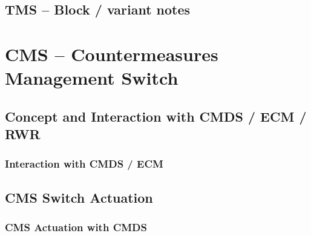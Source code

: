 \documentclass[11pt, a4paper, twoside]{report}
\begin{document}
\section{TMS -- Block / variant notes}
\label{sec:C4-S6}

\newpage

\chapter{CMS -- Countermeasures Management Switch}
\label{chap:C5}

\section{Concept and Interaction with CMDS / ECM / RWR}
\label{sec:C5-S1}

\subsection{Interaction with CMDS / ECM}
\label{sec:C5-S1-S1}

\section{CMS Switch Actuation}
\label{sec:C5-S2}

\subsection{CMS Actuation with CMDS}
\label{sec:C5-S2-S1}
\end{document}
